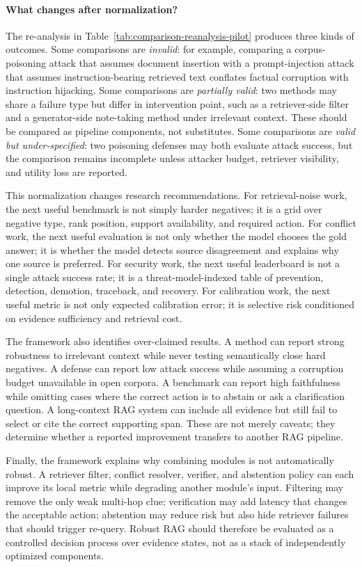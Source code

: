 \documentclass[11pt]{article}
\begin{document}
\paragraph{What changes after normalization?}
The re-analysis in Table~\ref{tab:comparison-reanalysis-pilot} produces three kinds of outcomes. Some comparisons are \emph{invalid}: for example, comparing a corpus-poisoning attack that assumes document insertion with a prompt-injection attack that assumes instruction-bearing retrieved text conflates factual corruption with instruction hijacking. Some comparisons are \emph{partially valid}: two methods may share a failure type but differ in intervention point, such as a retriever-side filter and a generator-side note-taking method under irrelevant context. These should be compared as pipeline components, not substitutes. Some comparisons are \emph{valid but under-specified}: two poisoning defenses may both evaluate attack success, but the comparison remains incomplete unless attacker budget, retriever visibility, and utility loss are reported.

This normalization changes research recommendations. For retrieval-noise work, the next useful benchmark is not simply harder negatives; it is a grid over negative type, rank position, support availability, and required action. For conflict work, the next useful evaluation is not only whether the model chooses the gold answer; it is whether the model detects source disagreement and explains why one source is preferred. For security work, the next useful leaderboard is not a single attack success rate; it is a threat-model-indexed table of prevention, detection, demotion, traceback, and recovery. For calibration work, the next useful metric is not only expected calibration error; it is selective risk conditioned on evidence sufficiency and retrieval cost.

The framework also identifies over-claimed results. A method can report strong robustness to irrelevant context while never testing semantically close hard negatives. A defense can report low attack success while assuming a corruption budget unavailable in open corpora. A benchmark can report high faithfulness while omitting cases where the correct action is to abstain or ask a clarification question. A long-context RAG system can include all evidence but still fail to select or cite the correct supporting span. These are not merely caveats; they determine whether a reported improvement transfers to another RAG pipeline.

Finally, the framework explains why combining modules is not automatically robust. A retriever filter, conflict resolver, verifier, and abstention policy can each improve its local metric while degrading another module's input. Filtering may remove the only weak multi-hop clue; verification may add latency that changes the acceptable action; abstention may reduce risk but also hide retriever failures that should trigger re-query. Robust RAG should therefore be evaluated as a controlled decision process over evidence states, not as a stack of independently optimized components.
\end{document}
